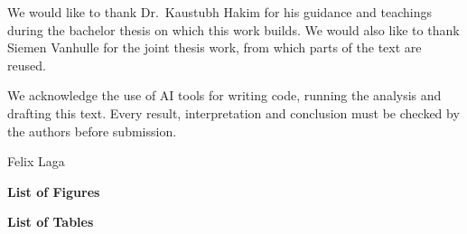 \documentclass[11pt,a4paper,twocolumn]{report}
\begin{document}
\begin{frontpage}
\begin{narrowtext}
We would like to thank Dr.\ Kaustubh Hakim for his guidance and teachings during the
bachelor thesis on which this work builds. We would also like to thank Siemen Vanhulle
for the joint thesis work, from which parts of the text are reused.\par
\vspace{3pt}
We acknowledge the use of AI tools for writing code, running the analysis and drafting this
text. Every result, interpretation and conclusion must be checked by the authors before
submission.\par
\vspace{18pt}
\hfill Felix Laga
\end{narrowtext}
\end{frontpage}

\begin{frontpage}
\makeatletter{}\makeatother
\end{frontpage}

\begin{frontpage}

\end{frontpage}

\begin{frontpage}
{\noindent\bfseries\large List of Figures\par}\vspace{8pt}
\makeatletter{}\makeatother
\vspace{18pt}
{\noindent\bfseries\large List of Tables\par}\vspace{8pt}
\makeatletter{}\makeatother
\end{frontpage}

\begin{frontpage}

\end{frontpage}

\twocolumn
{}
\pagestyle{fancy}






\end{document}
